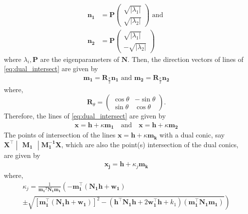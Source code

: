 \documentclass[journal,12pt,twocolumn]{IEEEtran}
\let\vec\mathbf
\newcommand{\myvec}[1]{\ensuremath{\begin{pmatrix}#1\end{pmatrix}}}
\newcommand{\mydet}[1]{\ensuremath{\begin{vmatrix}#1\end{vmatrix}}}
\providecommand{\brak}[1]{\ensuremath{\left(#1\right)}}
\providecommand{\abs}[1]{\left\vert#1\right\vert}
\providecommand{\lbrak}[1]{\ensuremath{\left(#1\right.}}
\providecommand{\rbrak}[1]{\ensuremath{\left.#1\right)}}
\providecommand{\sbrak}[1]{\ensuremath{{}\left[#1\right]}}
\begin{document}
\begin{align*}
		\vec{n_1} &= \vec{P}\myvec{\sqrt{\abs{\lambda_1}}\\ \sqrt{\abs{\lambda_2}}} \text{ and } \\
		\vec{n_2} &= \vec{P}\myvec{\sqrt{\abs{\lambda_1}}\\ -\sqrt{\abs{\lambda_2}}}
\end{align*}
where $\lambda_i, \vec{P}$ are the eigenparameters of $\vec{N}$. Then, the direction vectors of lines of \eqref{eq:dual_intersect} are given by
\begin{gather}
		\vec{m_1} = \vec{R}_{\frac{\pi}{2}}\vec{n_1} \text{ and } \vec{m_2} = \vec{R}_{\frac{\pi}{2}}\vec{n_2}
\end{gather}
where, \[ \vec{R}_{\theta} = \myvec{\cos  \theta & -\sin \theta \\ \sin \theta & \cos \theta} \text{.} \]
Therefore, the lines of \eqref{eq:dual_intersect} are given by
\begin{align*}
		\vec{x} = \vec{h} + \kappa\vec{m_1} \quad \text{and} \quad
		\vec{x} = \vec{h} + \kappa\vec{m_2} 
\end{align*}
\newpage
The points of intersection of the lines $\vec{x} = \vec{h} + \kappa\vec{m_k}$ with a dual conic, say $\vec{X^{\top}}\mydet{\vec{M_1}}\vec{M_1^{-1}}\vec{X}$, which are also the point(s) intersection of the dual conics, are given by
\begin{align}
		\vec{x_j} = \vec{h} + \kappa_j\vec{m_k}
\end{align}
where,
{\tiny
\begin{multline*}
\kappa_j = \frac{1}
{
\vec{m_1}^T\vec{N_1}\vec{m_1}
}
\lbrak{-\vec{m_1^{\top}}\brak{\vec{N_1}\vec{h}+\vec{w_1}}}
\\[0.5ex]
\pm
\rbrak{\sqrt{
\sbrak{
\vec{m_1^{\top}}\brak{\vec{N_1}\vec{h}+\vec{w_1}}
}^2
-
\brak
{
\vec{h^{\top}}\vec{N_1}\vec{h} + 2\vec{w_1^{\top}}\vec{h} +k_1
}
\brak{\vec{m_1^{\top}}\vec{N_1}\vec{m_1}}
}
}
\end{multline*}
}
\vspace{-0.5cm}
\end{document}
